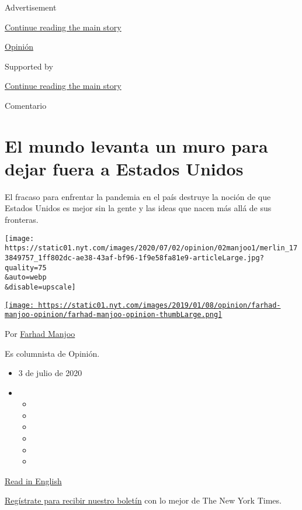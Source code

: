 Advertisement

\protect\hyperlink{after-top}{Continue reading the main story}

\href{/es/section/opinion}{Opinión}

Supported by

\protect\hyperlink{after-sponsor}{Continue reading the main story}

Comentario

\hypertarget{el-mundo-levanta-un-muro-para-dejar-fuera-a-estados-unidos}{%
\section{El mundo levanta un muro para dejar fuera a Estados
Unidos}\label{el-mundo-levanta-un-muro-para-dejar-fuera-a-estados-unidos}}

El fracaso para enfrentar la pandemia en el país destruye la noción de
que Estados Unidos es mejor sin la gente y las ideas que nacen más allá
de sus fronteras.

\texttt{[image: https://static01.nyt.com/images/2020/07/02/opinion/02manjoo1/merlin\_173849757\_1ff802dc-ae38-43af-bf96-1f9e58fa81e9-articleLarge.jpg?quality=75\\\&auto=webp\\\&disable=upscale]}

\href{https://www.nytimes.com/by/farhad-manjoo}{\texttt{[image: https://static01.nyt.com/images/2019/01/08/opinion/farhad-manjoo-opinion/farhad-manjoo-opinion-thumbLarge.png]}}

Por \href{https://www.nytimes.com/by/farhad-manjoo}{Farhad Manjoo}

Es columnista de Opinión.

\begin{itemize}
\item
  3 de julio de 2020
\item
  \begin{itemize}
  \item
  \item
  \item
  \item
  \item
  \item
  \end{itemize}
\end{itemize}

\href{https://www.nytimes.com/2020/07/01/opinion/us-travel-ban-europe.html}{Read
in English}

\href{https://www.nytimes.com/newsletters/el-times}{Regístrate para
recibir nuestro boletín} con lo mejor de The New York Times.

